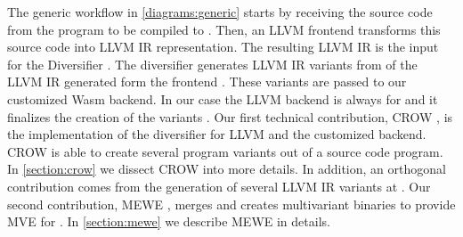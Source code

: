 The generic workflow in \autoref{diagrams:generic} starts by receiving the source code from the program to be compiled to \wasm. Then, an LLVM frontend transforms this source code into LLVM IR representation. The resulting LLVM IR is the input for the Diversifier .  
The diversifier generates LLVM IR variants from of the LLVM IR generated form the frontend . These variants are passed to our customized Wasm backend. In our case the LLVM backend is always for \wasm and it finalizes the creation of the variants . Our first technical contribution, CROW \cite{CROW}, is the implementation of the diversifier for LLVM and the customized \wasm backend. CROW is able to create several \wasm program variants out of a source code program. In \autoref{section:crow} we dissect CROW into more details.
In addition, an orthogonal contribution comes from the generation of several LLVM IR variants at . Our second contribution, MEWE \cite{MEWE}, merges and creates multivariant binaries to provide MVE for \wasm {}. In \autoref{section:mewe} we describe MEWE in details.

